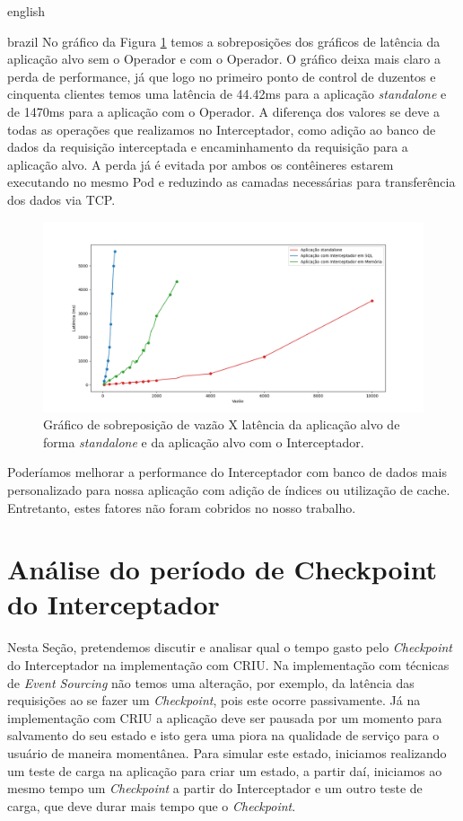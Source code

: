 \begin{otherlanguage*}{english}
\begin{otherlanguage*}{brazil}
No gráfico da Figura \ref{fig:analysis-interceptor-standalone} temos a sobreposições 
dos gráficos de latência da aplicação alvo sem o Operador e com o Operador. O gráfico
deixa mais claro a perda de performance, já que logo no primeiro ponto de control de
duzentos e cinquenta clientes temos uma latência de 44.42ms para a aplicação
\textit{standalone} e de 1470ms para a aplicação com o Operador. A diferença dos valores
se deve a todas as operações que realizamos no Interceptador, como adição ao banco de
dados da requisição interceptada e encaminhamento da requisição para a aplicação alvo.
A perda já é evitada por ambos os contêineres estarem executando no mesmo Pod e reduzindo
as camadas necessárias para transferência dos dados via TCP.

\begin{figure}[h]
\centering
\includegraphics[scale=0.46]{images/vazaoxlatencia.png}
\caption{Gráfico de sobreposição de vazão X latência da aplicação alvo de forma \textit{standalone} e da aplicação alvo com o Interceptador.}
\label{fig:analysis-interceptor-standalone}
\end{figure}

Poderíamos melhorar a performance do Interceptador com banco de dados mais personalizado para
nossa aplicação com adição de índices ou utilização de cache. Entretanto, estes fatores não
foram cobridos no nosso trabalho.

\section{Análise do período de Checkpoint do Interceptador}

Nesta Seção, pretendemos discutir e analisar qual o tempo gasto pelo \textit{Checkpoint} do
Interceptador na implementação com CRIU. Na implementação com técnicas de
\textit{Event Sourcing} não temos uma alteração, por exemplo, da latência das requisições ao
se fazer um \textit{Checkpoint}, pois este ocorre passivamente. Já na implementação com CRIU
a aplicação deve ser pausada por um momento para salvamento do seu estado e isto gera uma
piora na qualidade de serviço para o usuário de maneira momentânea. Para simular este estado,
iniciamos realizando um teste de carga na aplicação para criar um estado, a partir daí, iniciamos
ao mesmo tempo um \textit{Checkpoint} a partir do Interceptador e um outro teste de carga, que deve
durar mais tempo que o \textit{Checkpoint}.


\end{otherlanguage*}
\end{otherlanguage*}
